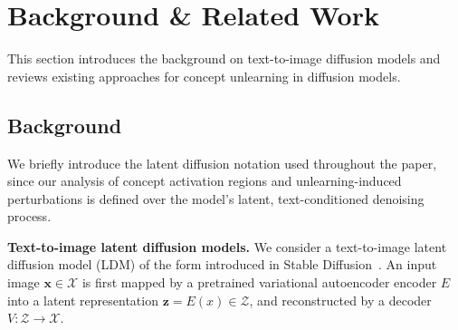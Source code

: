 \section{Background \& Related Work}
\label{sec:background}
This section introduces the background on text-to-image diffusion models and reviews existing approaches for concept unlearning in diffusion models.

\subsection{Background}
We briefly introduce the latent diffusion notation used throughout the paper, since our analysis of concept activation regions and unlearning-induced perturbations is defined over the model's latent, text-conditioned denoising process.

\textbf{Text-to-image latent diffusion models.}
We consider a text-to-image latent diffusion model (LDM) of the form introduced in Stable Diffusion~\citep{rombach2022high}.
An input image $\mathbf{x} \in \mathcal{X}$ is first mapped by a pretrained variational autoencoder encoder $E$ into a latent representation 
$\mathbf{z} = E(x) \in \mathcal{Z}$, and reconstructed by a decoder $V : \mathcal{Z} \rightarrow \mathcal{X}$. 

